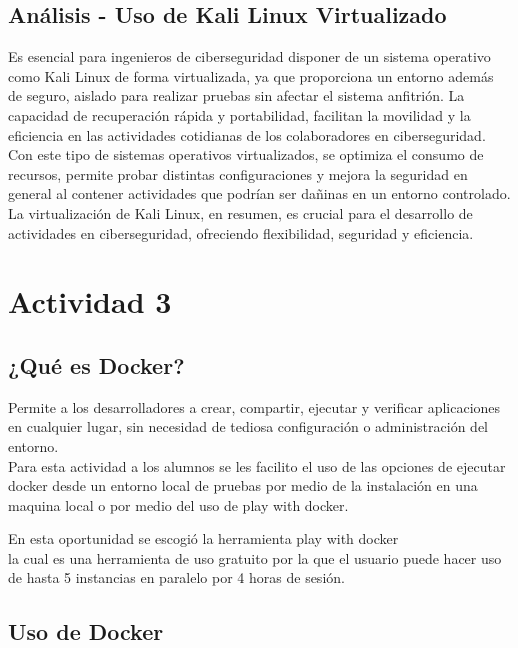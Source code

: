 \documentclass[stu, 11pt, letterpaper, donotrepeattitle, floatsintext, natbib]{apa7}
\begin{document}
\subsection{Análisis - Uso de Kali Linux Virtualizado}

Es esencial para ingenieros de ciberseguridad disponer de un sistema operativo como Kali Linux de forma virtualizada, ya que proporciona un entorno además de seguro, aislado para realizar pruebas sin afectar el sistema anfitrión. La capacidad de recuperación rápida y portabilidad, facilitan la movilidad y la eficiencia en las actividades cotidianas de los colaboradores en ciberseguridad. Con este tipo de sistemas operativos virtualizados, se optimiza el consumo de recursos, permite probar distintas configuraciones y mejora la seguridad en general al contener actividades que podrían ser dañinas en un entorno controlado. La virtualización de Kali Linux, en resumen, es crucial para el desarrollo de actividades en ciberseguridad, ofreciendo flexibilidad, seguridad y eficiencia.
 


\newpage

\section{\large Actividad 3}

\subsection{¿Qué es Docker?} 
Permite a los desarrolladores a crear, compartir, ejecutar y verificar aplicaciones en cualquier lugar, sin necesidad de tediosa configuración o administración del entorno. 
\noindent \citep{docker}\\

Para esta actividad a los alumnos se les facilito el uso de las opciones de ejecutar docker desde un entorno local de pruebas por medio de la instalación en una maquina local o por medio del uso de play with docker.

En esta oportunidad se escogió la herramienta play with docker \noindent \citep{playwithdocker}\\ la cual es una herramienta de uso gratuito por la que el usuario puede hacer uso de hasta 5 instancias en paralelo por 4 horas de sesión.

\subsection{Uso de Docker} 
\end{document}
